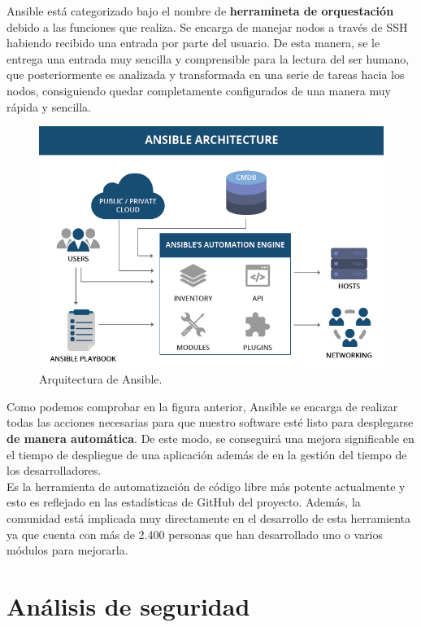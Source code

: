 Ansible está categorizado bajo el nombre de \textbf{herramineta de orquestación} debido a 
las funciones que realiza. Se encarga de manejar nodos a través de SSH habiendo recibido
una entrada por parte del usuario. De esta manera, se le entrega una entrada muy sencilla
y comprensible para la lectura del ser humano, que posteriormente es analizada y transformada
en una serie de tareas hacia los nodos, consiguiendo quedar completamente configurados de una
manera muy rápida y sencilla.\\


\begin{figure}[H]
	\centering
	\includegraphics[scale=0.45]{imagenes/ansible.png}
	\caption{Arquitectura de Ansible. \label{fig:figura7}}
\end{figure}

Como podemos comprobar en la figura anterior, Ansible se encarga de realizar todas las acciones
necesarias para que nuestro software esté listo para desplegarse \textbf{de manera automática}.
De este modo, se conseguirá una mejora significable en el tiempo de despliegue de una aplicación
además de en la gestión del tiempo de los desarrolladores.\\

Es la herramienta de automatización de código libre más potente actualmente y esto es reflejado
en las estadísticas de GitHub del proyecto. Además, la comunidad está implicada muy directamente
en el desarrollo de esta herramienta ya que cuenta con más de 2.400 personas que han desarrollado
uno o varios módulos para mejorarla.

\section{Análisis de seguridad}
